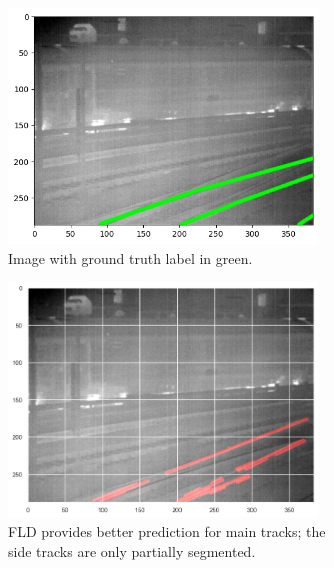 \documentclass[Master,MDS,english]{BASE/twbook} %
\begin{document}
\begin{figure}[H]
\centering
\begin{subfigure}[t]{.33\textwidth}
  \centering
  \includegraphics[width=0.9\textwidth]{images/results/example1_gt}
  \caption{Image with ground truth label in green.}
\end{subfigure}%
\begin{subfigure}[t]{.33\textwidth}
  \centering
  \includegraphics[width=0.9\textwidth]{images/results/example1_fld}
  \caption{FLD provides better prediction for main tracks; the side tracks are only partially segmented.}
\end{subfigure}%
\begin{subfigure}[t]{.33\textwidth}
  \centering

\end{subfigure}
\end{figure}
\end{document}
